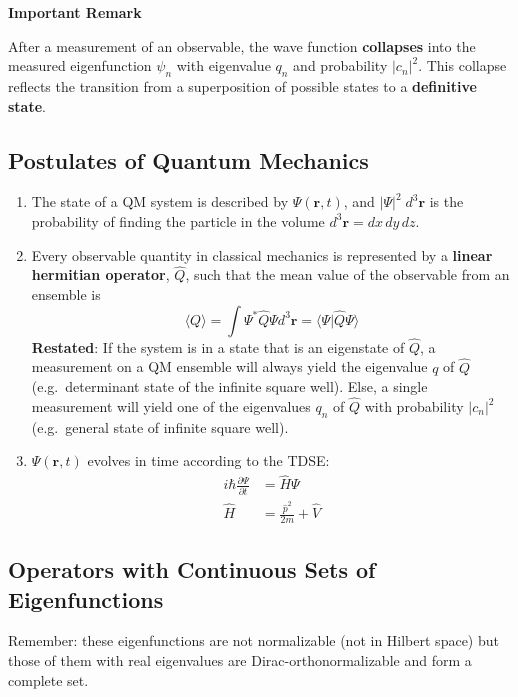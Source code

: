\textbf{Important Remark}

After a measurement of an observable, the wave function \textbf{collapses} into the measured eigenfunction $\psi_n$ with eigenvalue $q_n$ and probability $|c_n|^2$. This collapse reflects the transition from a superposition of possible states to a \textbf{definitive state}.

\subsection{Postulates of Quantum Mechanics}

\begin{enumerate}
    \item The state of a QM system is described by $\Psi(\mathbf{r},t)$, and $|\Psi|^2\; d^3 \mathbf{r}$ is the probability of finding the particle in the volume $d^3 \mathbf{r} = dx\,dy\,dz$.
    \item Every observable quantity in classical mechanics is represented by a \textbf{linear hermitian operator}, $\hat{Q}$, such that the mean value of the observable from an ensemble is
          \noindent\begin{equation*}
              \langle Q\rangle=\int\Psi^{*}\hat{Q}\Psi d^{3} \mathbf{r}= \langle\Psi|\hat{Q}\Psi\rangle
          \end{equation*}\newline
          \textbf{Restated}:\newline
          If the system is in a state that is an eigenstate of $\hat{Q}$, a measurement on a QM ensemble will always yield the eigenvalue $q$ of $\hat{Q}$ (e.g.\ determinant state of the infinite square well).\newline
          Else, a single measurement will yield one of the eigenvalues $q_n$ of $\hat{Q}$ with probability $|c_n|^2$ (e.g.\ general state of infinite square well).
    \item $\Psi(\mathbf{r},t)$ evolves in time according to the TDSE:
          \noindent\begin{align*}
              i\hbar \frac{\partial \Psi}{\partial t} & =\hat{H}\Psi                     \\
              \hat{H}                                 & = \frac{\hat{p}^2}{2m} + \hat{V}
          \end{align*}
\end{enumerate}

\subsection{Operators with Continuous Sets of Eigenfunctions}
Remember: these eigenfunctions are not normalizable (not in Hilbert space) but those of them with real eigenvalues are Dirac-orthonormalizable and form a complete set.

